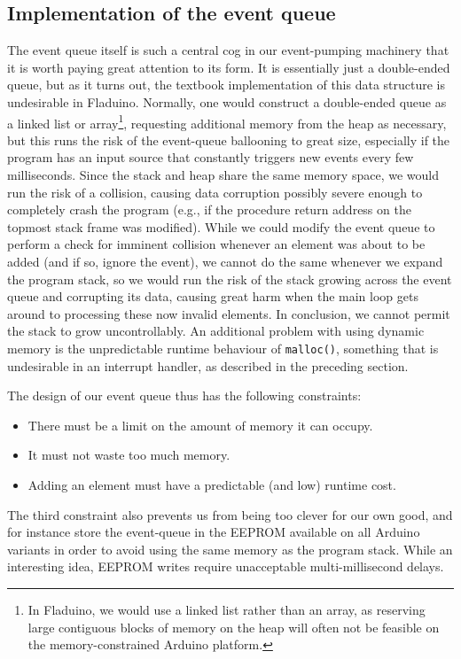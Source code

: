 \documentclass[a4paper, oneside, final]{memoir}
\begin{document}
\subsection{Implementation of the event queue}
\label{sec:event_queue}
The event queue itself is such a central cog in our event-pumping
machinery that it is worth paying great attention to its form.  It is
essentially just a double-ended queue, but as it turns out, the
textbook implementation of this data structure is undesirable in
Fladuino.  Normally, one would construct a double-ended queue as a
linked list or array\footnote{In Fladuino, we would use a linked list
  rather than an array, as reserving large contiguous blocks of memory
  on the heap will often not be feasible on the memory-constrained
  Arduino platform.}, requesting additional memory from the heap as
necessary, but this runs the risk of the event-queue ballooning to
great size, especially if the program has an input source that
constantly triggers new events every few milliseconds.  Since the
stack and heap share the same memory space, we would run the risk of a
collision, causing data corruption possibly severe enough to
completely crash the program (e.g., if the procedure return address on
the topmost stack frame was modified).  While we could modify the
event queue to perform a check for imminent collision whenever an
element was about to be added (and if so, ignore the event), we cannot
do the same whenever we expand the program stack, so we would run the
risk of the stack growing across the event queue and corrupting its
data, causing great harm when the main loop gets around to processing
these now invalid elements.  In conclusion, we cannot permit the stack
to grow uncontrollably.  An additional problem with using dynamic
memory is the unpredictable runtime behaviour of \texttt{malloc()},
something that is undesirable in an interrupt handler, as described in
the preceding section.

The design of our event queue thus has the following constraints:

\begin{itemize}
\item There must be a limit on the amount of memory it can occupy.
\item It must not waste too much memory.
\item Adding an element must have a predictable (and low) runtime
  cost.
\end{itemize}

The third constraint also prevents us from being too clever for our
own good, and for instance store the event-queue in the EEPROM
available on all Arduino variants in order to avoid using the same
memory as the program stack.  While an interesting idea, EEPROM writes
require unacceptable multi-millisecond delays.
\end{document}
